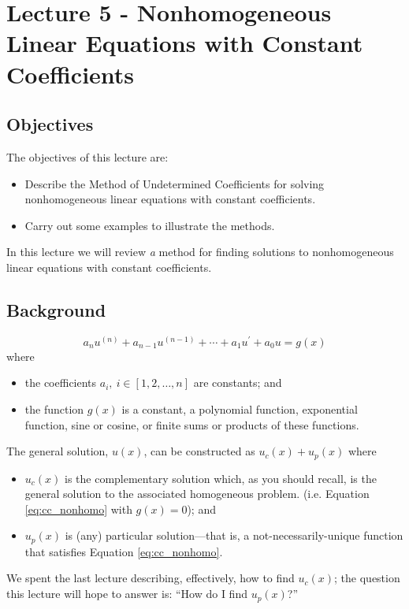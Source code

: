 \chapter{Lecture 5 - Nonhomogeneous Linear Equations with Constant Coefficients}
\label{ch:lec5}
\section{Objectives}
The objectives of this lecture are:
\begin{itemize}
\item Describe the Method of Undetermined Coefficients for solving nonhomogeneous linear equations with constant coefficients.
\item Carry out some examples to illustrate the methods.
\end{itemize}
In this lecture we will review \emph{a} method for finding solutions to nonhomogeneous linear equations with constant coefficients.
\section{Background}
\begin{equation}
a_nu^{(n)} + a_{n-1}u^{(n-1)}+\cdots+a_1u^{\prime}+a_0u = g(x)
\label{eq:cc_nonhomo}
\end{equation}
where
\begin{itemize}
\item the coefficients $a_i, \ i\in [1,2,\dots,n]$ are constants; and
\item the function $g(x)$ is a constant, a polynomial function, exponential function, sine or cosine, or finite sums or products of these functions.
\end{itemize}
The general solution, $u(x)$, can be constructed as $u_c(x)+u_p(x)$ where
\begin{itemize}
\item $u_c(x)$ is the complementary solution which, as you should recall, is the general solution to the associated homogeneous problem. (i.e. Equation \ref{eq:cc_nonhomo} with $g(x)=0$); and
\item $u_p(x)$ is (any) particular solution---that is, a not-necessarily-unique function that satisfies Equation \ref{eq:cc_nonhomo}.
\end{itemize}
We spent the last lecture describing, effectively, how to find $u_c(x)$; the question this lecture will hope to answer is: ``How do I find $u_p(x)$?''  
